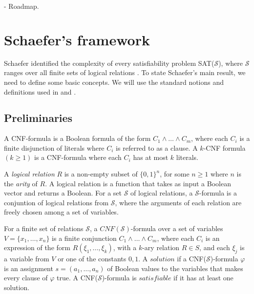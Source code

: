- Roadmap.


\section{Schaefer's framework}\label{sec:schaefer's framework}
Schaefer identified the complexity of every satisfiability problem SAT($\mathcal{S}$), where $\mathcal{S}$ ranges over all finite sets of
logical relations \cite{schwerdtfeger_computational_2015}. To state Schaefer’s main result, we need to define some basic concepts.
We will use the standard notions and definitions used in \cite{schaefer_complexity_1978} and \cite{DBLP:journals/siamcomp/GopalanKMP09}.

\subsection{Preliminaries}

A CNF-formula is a Boolean formula of the form $C_{1} \land \dots \land C_{m}$, where each $C_i$ is a finite disjunction of literals where $C_i$
is referred to as a clause. A $k$-CNF formula $(k \geq 1)$ is a CNF-formula where each $C_i$ has at most $k$ literals.


A \textit{logical relation} $R$ is a non-empty subset of $\{0,1\}^n$, for some $n \geq 1$ where $n$ is the \textit{arity} of $R$.
A logical relation is a function that takes as input a Boolean vector and returns a Boolean. For a set $\mathcal{S}$ of logical relations, a
$\mathcal{S}$-formula is a conjuntion of logical relations from $\mathcal{S}$, where the arguments of each relation are freely chosen among
a set of variables.

For a finite set of relations $\mathcal{S}$, a $CNF(\mathcal{S})$-formula over a set of variables $V = \{x_1, \dots, x_n\}$ is a finite
conjunction $C_{1} \land \dots \land C_{m}$, where each $C_i$ is an expression of the form $R(\xi_1,\dots , \xi_k)$, with a $k$-ary
relation $R \in S$, and each $\xi_j$ is a variable from $V$ or one of the constants $0, 1$. A $\textit{solution}$ if a
CNF($\mathcal{S}$)-formula $\varphi$ is an assignment $s = (a_{1}, \dots, a_{n})$ of Boolean values to the variables that makes every
clause of $\varphi$ true. A CNF($\mathcal{S}$)-formula is $\textit{satisfiable}$ if it has at least one solution.

